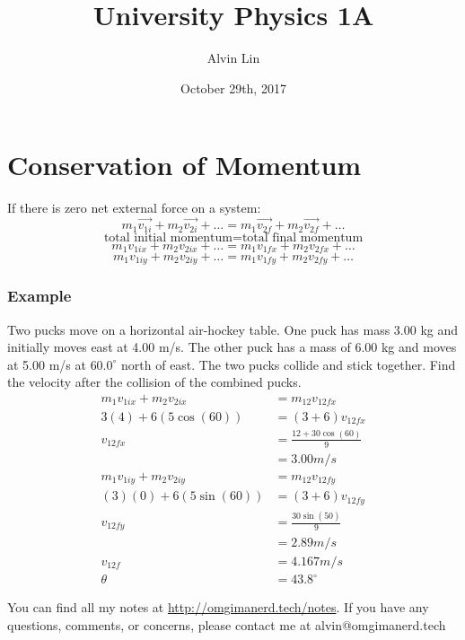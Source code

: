 \documentclass{math}
\title{University Physics 1A}
\author{Alvin Lin}
\date{October 29th, 2017}
\begin{document}
\maketitle

\section*{Conservation of Momentum}
If there is zero net external force on a system:
\[ m_1\overrightarrow{v_{1i}}+m_2\overrightarrow{v_{2i}}+\dots =
  m_1\overrightarrow{v_{2f}}+m_2\overrightarrow{v_{2f}}+\dots \]
\[ \text{total initial momentum} = \text{total final momentum} \]
\[ m_1v_{1ix}+m_2v_{2ix}+\dots = m_1v_{1fx}+m_2v_{2fx}+\dots \]
\[ m_1v_{1iy}+m_2v_{2iy}+\dots = m_1v_{1fy}+m_2v_{2fy}+\dots \]

\subsubsection*{Example}
Two pucks move on a horizontal air-hockey table. One puck has mass 3.00 kg and
initially moves east at 4.00 m/s. The other puck has a mass of 6.00 kg and
moves at 5.00 m/s at \( 60.0^{\circ} \) north of east. The two pucks collide and
stick together. Find the velocity after the collision of the combined pucks.
\begin{align*}
  m_1v_{1ix}+m_2v_{2ix} &= m_{12}v_{12fx} \\
  3(4)+6(5\cos(60)) &= (3+6)v_{12fx} \\
  v_{12fx} &= \frac{12+30\cos(60)}{9} \\
  &= 3.00m/s \\
  m_1v_{1iy}+m_2v_{2iy} &= m_{12}v_{12fy} \\
  (3)(0)+6(5\sin(60)) &= (3+6)v_{12fy} \\
  v_{12fy} &= \frac{30\sin(50)}{9} \\
  &= 2.89m/s \\
  v_{12f} &= 4.167m/s \\
  \theta &= 43.8^{\circ}
\end{align*}

\begin{center}
  You can find all my notes at \url{http://omgimanerd.tech/notes}. If you have
  any questions, comments, or concerns, please contact me at
  alvin@omgimanerd.tech
\end{center}
\end{document}
